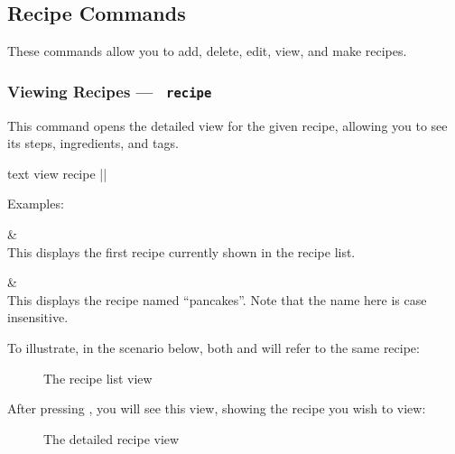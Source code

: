 
\pagebreak
\hypertarget{GroupRecipeCommands}{}
\subsection{Recipe Commands}

These commands allow you to add, delete, edit, view, and make recipes.

\hypertarget{ViewRecipeCommand}{}
\subsubsection{Viewing Recipes — \texttt{ recipe}}

	This command opens the detailed view for the given recipe, allowing you to see its steps, ingredients, and tags.

	 \begin{blockofcode}{text}
		view recipe |\itemref{}|
	\end{blockofcode}

	Examples:
	\begin{bulletlist}
		&  \\
			This displays the first recipe currently shown in the recipe list.

		&  \\
		This displays the recipe named \enquote{pancakes}. Note that the name here is case insensitive.

	\end{bulletlist}

	To illustrate, in the scenario below, both  and  will refer to the same recipe:

	\begin{figure}[!htbp]\centering\ContinuedFloat*
		\caption{The recipe list view}
	\end{figure}

	\pagebreak
	After pressing , you will see this view, showing the recipe you wish to view:

	\begin{figure}[!htbp]\centering\ContinuedFloat
		\caption{The detailed recipe view}
	\end{figure}









